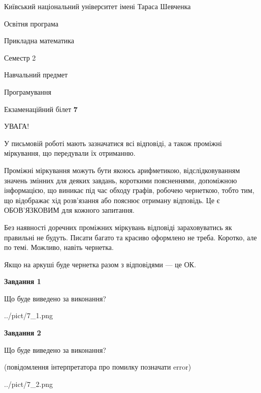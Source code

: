 \documentclass[12pt, ukrainian]{article}
\begin{document}
{{\begin {small}\par
{ \center  Київський національний університет імені Тараса Шевченка \par}
{\parbox {5 cm}{Освітня програма \hfill}{\parbox {7 cm}{Прикладна математика\hfill}}\parbox {6 cm}{\hfill Семестр 2}}\par
{\parbox {5 cm} {Навчальний предмет \hfill}\parbox {7 cm}{Програмування \hfill}\parbox {6cm}{\hfill}\par}\vspace{-7pt} \end{small}}{\center Екзаменаційний білет \No \textbf
{ 7 }\par}}
{
\begin {large}
УВАГА!

У письмовій роботі мають зазначатися всі відповіді, а також проміжні міркування, що передували їх отриманню.

Проміжні міркування можуть бути якоюсь арифметикою, відслідковуванням зна\-чень змінних для деяких завдань,
короткими поясненнями, допоміжною інформацією, що виникає під час обходу графів, робочею чернеткою,
тобто тим, що відображає хід розв’язання або пояснює отриману відповідь.
Це є ОБОВ’ЯЗКОВИМ для кожного запитання.

Без наявності доречних проміжних міркувань відповіді зараховуватись як правиль\-ні не будуть.
Писати багато та красиво оформлено не треба. Коротко, але по темі. Можли\-во, навіть чернетка.

Якщо на аркуші буде чернетка разом з відповідями --- це ОК.

\newpage

{\begin {center}\textbf{Завдання 1}\end {center}}\par
Що буде виведено за виконання?\par
\begin{center}
	{../pict/7_1.png}
\end{center}
\newpage

{\begin {center}\textbf{Завдання 2}\end {center}}\par
Що буде виведено за виконання?\par
 (повідомлення інтерпретатора про помилку позначати error)\par
\begin{center}
	{../pict/7_2.png}
\end{center}
\newpage


\end{large}}
\end{document}
